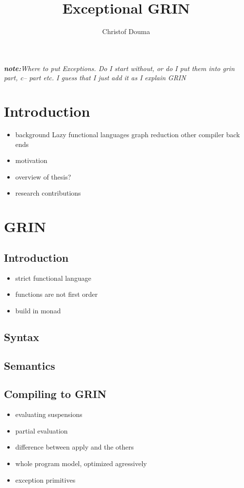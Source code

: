 \documentclass{book}
\title{Exceptional GRIN}
\author{Christof Douma}
\newcommand{\note}[1]{\emph{\textbf{note:}#1}

}
\begin{document}
\maketitle{}

\note{Where to put Exceptions. Do I start without, or do I put them into grin part, c-- part etc.
I guess that I just add it as I explain GRIN}

\chapter{Introduction}

\begin{itemize}
	\item background
		\subitem Lazy functional languages
		\subitem graph reduction
		\subitem other compiler back ends
	\item motivation
	\item overview of thesis?
	\item research contributions
\end{itemize}

\chapter{GRIN}

\section{Introduction}

\begin{itemize}
	\item strict functional language
	\item functions are not first order
	\item build in monad
\end{itemize}

\section{Syntax}

\section{Semantics}

\section{Compiling to GRIN}

\begin{itemize}
	\item evaluating suspensions
	\item partial evaluation
	\item difference between apply and the others
	\item whole program model, optimized agressively
	\item exception primitives
\end{itemize}
\end{document}
